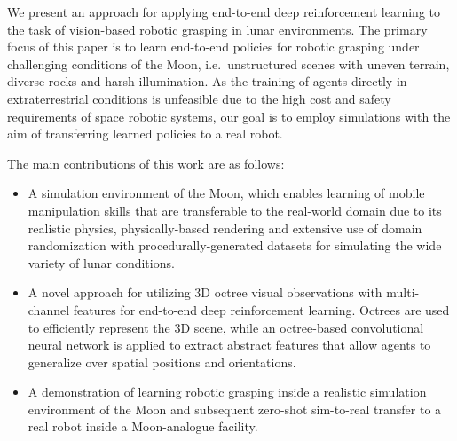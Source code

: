We present an approach for applying end-to-end deep reinforcement learning to the task of vision-based robotic grasping in lunar environments. The primary focus of this paper is to learn end-to-end policies for robotic grasping under challenging conditions of the Moon, i.e.~unstructured scenes with uneven terrain, diverse rocks and harsh illumination. As the training of agents directly in extraterrestrial conditions is unfeasible due to the high cost and safety requirements of space robotic systems, our goal is to employ simulations with the aim of transferring learned policies to a real robot.

The main contributions of this work are as follows:
\begin{itemize}
	\item A simulation environment of the Moon, which enables learning of mobile manipulation skills that are transferable to the real-world domain due to its realistic physics, physically-based rendering and extensive use of domain randomization with procedurally-generated datasets for simulating the wide variety of lunar conditions.
	\item A novel approach for utilizing 3D octree visual observations with multi-channel features for end-to-end deep reinforcement learning. Octrees are used to efficiently represent the 3D scene, while an octree-based convolutional neural network is applied to extract abstract features that allow agents to generalize over spatial positions and orientations.
	\item A demonstration of learning robotic grasping inside a realistic simulation environment of the Moon and subsequent zero-shot sim-to-real transfer to a real robot inside a Moon-analogue facility.
\end{itemize}
